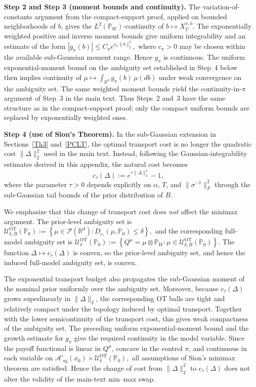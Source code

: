 \documentclass[11pt]{article}
\theoremstyle{definition}
\begin{document}
\medskip\noindent
\textbf{Step 2 and Step 3 (moment bounds and continuity).}
{
The variation-of-constants argument from the compact-support proof,
applied on bounded neighborhoods of $b$, gives the
$L^2(\mathbb P_W)$-continuity of
$b\mapsto X_T^{\pi,b}$. The exponentially weighted positive and inverse
moment bounds give uniform integrability and an estimate of the form $|g_\pi(b)|
\leq
C_\pi e^{c_\pi\|b\|_2^2},$
where $c_\pi>0$ may be chosen within the available sub-Gaussian moment
range. Hence $g_\pi$ is continuous. The uniform exponential-moment
bound on the ambiguity set established in Step~4 below then implies
continuity of $\mu
\longmapsto
\int_{\mathbb R^d}g_\pi(b)\,\mu(db)$
under weak convergence on the ambiguity set. The same weighted moment
bounds yield the continuity-in-$\pi$ argument of Step~3 in the main
text. Thus Steps~2 and~3 have the same structure as in the
compact-support proof; only the compact uniform bounds are replaced by
exponentially weighted ones.
}

\medskip\noindent
\textbf{Step 4 (use of Sion's Theorem).}
In the sub-Gaussian extension in Sections~\ref{Th3} and~\ref{PCLT},
the optimal transport cost is no longer the quadratic cost
$\|\Delta\|_2^2$ used in the main text. Instead, following the
Gaussian-integrability estimates derived in this appendix, the natural
cost becomes 
\begin{equation}
\label{eq:exp-cost}
c_\tau(\Delta)
:=
e^{\tau\|\Delta\|_2^2}-1,
\end{equation}
where the parameter $\tau>0$ depends explicitly on
$\alpha$, $T$, and $\|\sigma^{-1}\|_F^2$ through the sub-Gaussian tail
bounds of the prior distribution of $B$.

We emphasize that this change of transport cost does \emph{not} affect
the minimax argument. The prior-level ambiguity set is $\mathcal U_{\delta,B}^{\mathrm{OT}}(\mathbb P_0)
:=
\left\{
\mu\in\mathcal P(\mathbb R^d):
D_{c_\tau}(\mu,\mathbb P_0)\leq\delta
\right\},$
and the corresponding full-model ambiguity set is $\mathcal U_{\delta}^{\mathrm{OT}}(\mathbb P_0)
:=
\left\{
Q^\mu=\mu\otimes\mathbb P_W:
\mu\in\mathcal U_{\delta,B}^{\mathrm{OT}}(\mathbb P_0)
\right\}.$
The function $\Delta\mapsto c_\tau(\Delta)$ is convex, so the
prior-level ambiguity set, and hence the induced full-model ambiguity
set, is convex.

{
The exponential transport budget also propagates the sub-Gaussian
moment of the nominal prior uniformly over the ambiguity set. 
}
Moreover, because $c_\tau(\Delta)$ grows superlinearly in
$\|\Delta\|_2$, the corresponding OT balls are tight and relatively
compact under the topology induced by optimal transport.
{
Together with the lower semicontinuity of the transport cost, this
gives weak compactness of the ambiguity set. The preceding uniform
exponential-moment bound and the growth estimate for $g_\pi$ give the
required continuity in the model variable. Since the payoff functional
is linear in $Q^\mu$, concave in the control $\pi$, and
continuous in each variable on $\mathcal A'_{\mathrm{sg}}(x_0)
\times
\mathcal U_{\delta}^{\mathrm{OT}}(\mathbb P_0),$
all assumptions of Sion's minimax theorem are satisfied.
}
Hence the change of cost from $\|\Delta\|_2^2$ to $c_\tau(\Delta)$ does
not alter the validity of the main-text min--max swap.
\end{document}
